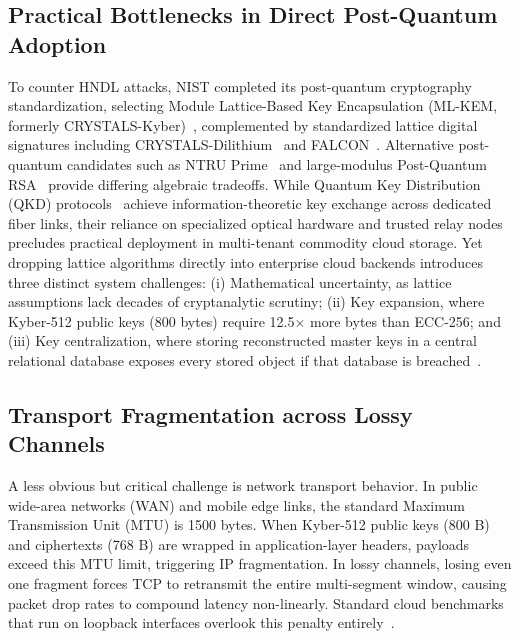 \documentclass[pdflatex,sn-mathphys,Numbered]{sn-jnl}%
\theoremstyle{thmstyleone}%
\theoremstyle{thmstyletwo}%
\theoremstyle{thmstylethree}%
\begin{document}
\subsection{\textbf{Practical Bottlenecks in Direct Post-Quantum Adoption}}
To counter HNDL attacks, NIST completed its post-quantum cryptography standardization, selecting Module Lattice-Based Key Encapsulation (ML-KEM, formerly CRYSTALS-Kyber)~\cite{bos2018crystals,avanzi2021crystals}, complemented by standardized lattice digital signatures including CRYSTALS-Dilithium~\cite{ducas2018crystals} and FALCON~\cite{fouque2020falcon}. Alternative post-quantum candidates such as NTRU Prime~\cite{bernstein2017ntru} and large-modulus Post-Quantum RSA~\cite{bernstein2017postrsa} provide differing algebraic tradeoffs. While Quantum Key Distribution (QKD) protocols~\cite{bennett2014quantum,gisin2002quantum} achieve information-theoretic key exchange across dedicated fiber links, their reliance on specialized optical hardware and trusted relay nodes precludes practical deployment in multi-tenant commodity cloud storage. Yet dropping lattice algorithms directly into enterprise cloud backends introduces three distinct system challenges: (i) Mathematical uncertainty, as lattice assumptions lack decades of cryptanalytic scrutiny; (ii) Key expansion, where Kyber-512 public keys (800 bytes) require 12.5$\times$ more bytes than ECC-256; and (iii) Key centralization, where storing reconstructed master keys in a central relational database exposes every stored object if that database is breached~\cite{sahai2021indistinguishability}.

\subsection{\textbf{Transport Fragmentation across Lossy Channels}}
A less obvious but critical challenge is network transport behavior. In public wide-area networks (WAN) and mobile edge links, the standard Maximum Transmission Unit (MTU) is 1500 bytes. When Kyber-512 public keys (800 B) and ciphertexts (768 B) are wrapped in application-layer headers, payloads exceed this MTU limit, triggering IP fragmentation. In lossy channels, losing even one fragment forces TCP to retransmit the entire multi-segment window, causing packet drop rates to compound latency non-linearly. Standard cloud benchmarks that run on loopback interfaces overlook this penalty entirely~\cite{sikeridis2020assessing}.
\end{document}
